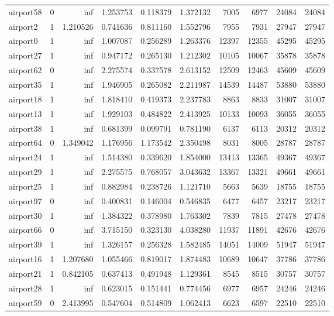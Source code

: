 \begin{longtable}{|l|r|r|r|r|r|r|r|r|r|}
airport58 & 0 & inf & 1.253753 & 0.118379 & 1.372132 & 7005 & 6977 & 24084 & 24084 \\
airport2 & 1 & 1.210526 & 0.741636 & 0.811160 & 1.552796 & 7955 & 7931 & 27947 & 27947 \\
airport0 & 1 & inf & 1.007087 & 0.256289 & 1.263376 & 12397 & 12355 & 45295 & 45295 \\
airport27 & 1 & inf & 0.947172 & 0.265130 & 1.212302 & 10105 & 10067 & 35878 & 35878 \\
airport62 & 0 & inf & 2.275574 & 0.337578 & 2.613152 & 12509 & 12463 & 45609 & 45609 \\
airport35 & 1 & inf & 1.946905 & 0.265082 & 2.211987 & 14539 & 14487 & 53880 & 53880 \\
airport18 & 1 & inf & 1.818410 & 0.419373 & 2.237783 & 8863 & 8833 & 31007 & 31007 \\
airport13 & 1 & inf & 1.929103 & 0.484822 & 2.413925 & 10133 & 10093 & 36055 & 36055 \\
airport38 & 1 & inf & 0.681399 & 0.099791 & 0.781190 & 6137 & 6113 & 20312 & 20312 \\
airport64 & 0 & 1.349042 & 1.176956 & 1.173542 & 2.350498 & 8031 & 8005 & 28787 & 28787 \\
airport24 & 1 & inf & 1.514380 & 0.339620 & 1.854000 & 13413 & 13365 & 49367 & 49367 \\
airport29 & 1 & inf & 2.275575 & 0.768057 & 3.043632 & 13367 & 13321 & 49661 & 49661 \\
airport25 & 1 & inf & 0.882984 & 0.238726 & 1.121710 & 5663 & 5639 & 18755 & 18755 \\
airport97 & 0 & inf & 0.400831 & 0.146004 & 0.546835 & 6477 & 6457 & 23217 & 23217 \\
airport30 & 1 & inf & 1.384322 & 0.378980 & 1.763302 & 7839 & 7815 & 27478 & 27478 \\
airport66 & 0 & inf & 3.715150 & 0.323130 & 4.038280 & 11937 & 11891 & 42676 & 42676 \\
airport39 & 1 & inf & 1.326157 & 0.256328 & 1.582485 & 14051 & 14009 & 51947 & 51947 \\
airport16 & 1 & 1.207680 & 1.055466 & 0.819017 & 1.874483 & 10689 & 10647 & 37786 & 37786 \\
airport21 & 1 & 0.842105 & 0.637413 & 0.491948 & 1.129361 & 8545 & 8515 & 30757 & 30757 \\
airport28 & 1 & inf & 0.623015 & 0.151441 & 0.774456 & 6977 & 6957 & 24246 & 24246 \\
airport59 & 0 & 2.413995 & 0.547604 & 0.514809 & 1.062413 & 6623 & 6597 & 22510 & 22510 \\

\end{longtable}

